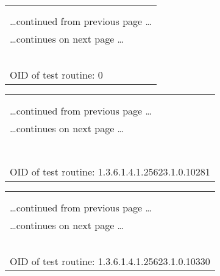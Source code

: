 \documentclass{article}
\begin{document}
\begin{longtable}{|p{}|}
\hline
\rowcolor{openvas_log}{\color{white}{Log}}\\
\rowcolor{openvas_log}{\color{white}{NVT: }}\\
\hline
\endfirsthead
\hfill\ldots continued from previous page \ldots \\
\hline
\endhead
\hline
\ldots continues on next page \ldots \\
\endfoot
\hline
\endlastfoot
\\
\rowcolor{white}{\verb=Open port.=}\\
\rowcolor{white}{\verb==}\\
\rowcolor{white}{\verb==}\\
\\
OID of test routine: 0\\
\end{longtable}

\begin{longtable}{|p{}|}
\hline
\rowcolor{openvas_log}{\color{white}{Log (CVSS: 0.0) }}\\
\rowcolor{openvas_log}{\color{white}{NVT: Detect Server type and version via Telnet}}\\
\hline
\endfirsthead
\hfill\ldots continued from previous page \ldots \\
\hline
\endhead
\hline
\ldots continues on next page \ldots \\
\endfoot
\hline
\endlastfoot
\\
\rowcolor{white}{\verb=Remote telnet banner :=}\\
\rowcolor{white}{\verb=Ubuntu 10.04.3 LTS =}\\
\rowcolor{white}{\verb=m3 login: =}\\
\rowcolor{white}{\verb==}\\
\rowcolor{white}{\verb==}\\
\\
OID of test routine: 1.3.6.1.4.1.25623.1.0.10281\\
\end{longtable}

\begin{longtable}{|p{}|}
\hline
\rowcolor{openvas_log}{\color{white}{Log (CVSS: 0.0) }}\\
\rowcolor{openvas_log}{\color{white}{NVT: Services}}\\
\hline
\endfirsthead
\hfill\ldots continued from previous page \ldots \\
\hline
\endhead
\hline
\ldots continues on next page \ldots \\
\endfoot
\hline
\endlastfoot
\\
\rowcolor{white}{\verb=A telnet server seems to be running on this port=}\\
\rowcolor{white}{\verb==}\\
\rowcolor{white}{\verb==}\\
\\
OID of test routine: 1.3.6.1.4.1.25623.1.0.10330\\
\end{longtable}
\end{document}
